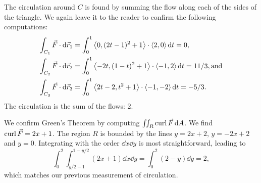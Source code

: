 \begin{example}
The circulation around $C$ is found by summing the flow along each of the sides of the triangle. We again leave it to the reader to confirm the following computations:
\begin{align*}
\int_{C_1}\vec F\cdot\operatorname{d}\!\vec r_1 &= \int_0^1\left\langle 0,(2t-1)^2+1\right\rangle\cdot\left\langle 2,0\right\rangle\operatorname{d}\! t = 0,\\
\int_{C_2}\vec F\cdot\operatorname{d}\!\vec r_2 &= \int_0^1\left\langle -2t,(1-t)^2+1\right\rangle\cdot\left\langle -1,2\right\rangle\operatorname{d}\! t = 11/3, \text{and}\\
\int_{C_3}\vec F\cdot\operatorname{d}\!\vec r_3 &= \int_0^1\left\langle 2t-2,t^2+1\right\rangle\cdot\left\langle -1,-2\right\rangle\operatorname{d}\! t = -5/3.
\end{align*}
The circulation is the sum of the flows: $2$.

We confirm Green's Theorem by computing $\iint_R \operatorname{curl} \vec F\operatorname{d}\! A$. We find $\operatorname{curl} \vec F = 2x+1$. The region $R$ is bounded by the lines $y = 2x+2$, $y=-2x+2$ and $y=0$. Integrating with the order $\dd x\dd y$ is most straightforward, leading to
\[\int_0^2\int_{y/2-1}^{1-y/2} (2x+1)\dd x\dd y = \int_0^2 (2-y)\dd y = 2,\]
which matches our previous measurement of circulation.
\end{example}

